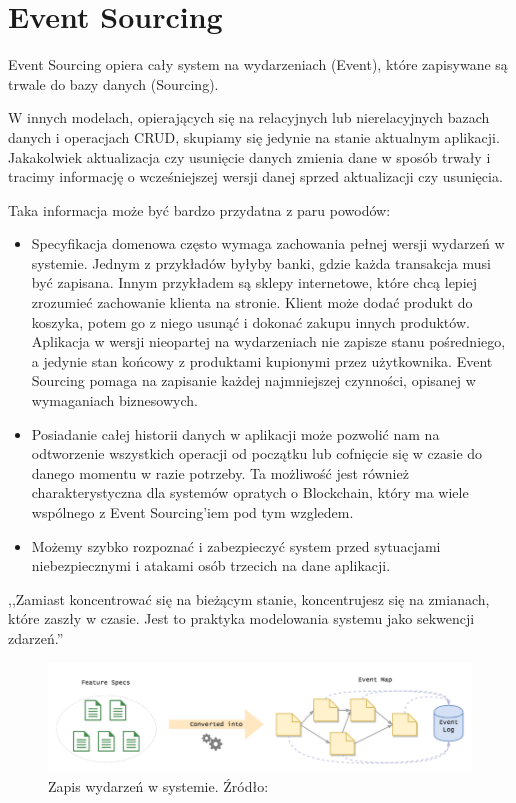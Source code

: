 \section{Event Sourcing}
Event Sourcing opiera cały system na wydarzeniach (Event), które zapisywane są trwale do bazy danych (Sourcing). 

W innych modelach, opierających się na relacyjnych lub nierelacyjnych bazach danych i operacjach CRUD, skupiamy się jedynie na stanie aktualnym aplikacji. Jakakolwiek aktualizacja czy usunięcie danych zmienia dane w sposób trwały i tracimy informację o wcześniejszej wersji danej sprzed aktualizacji czy usunięcia.

Taka informacja może być bardzo przydatna z paru powodów:
\begin{itemize}
    \item Specyfikacja domenowa często wymaga zachowania pełnej wersji wydarzeń w systemie. Jednym z przykładów byłyby banki, gdzie każda transakcja musi być zapisana. Innym przykładem są sklepy internetowe, które chcą lepiej zrozumieć zachowanie klienta na stronie. Klient może dodać produkt do koszyka, potem go z niego usunąć i dokonać zakupu innych produktów. Aplikacja w wersji nieopartej na wydarzeniach nie zapisze stanu pośredniego, a jedynie stan końcowy z produktami kupionymi przez użytkownika. Event Sourcing pomaga na zapisanie każdej najmniejszej czynności, opisanej w wymaganiach biznesowych.
    \item Posiadanie całej historii danych w aplikacji może pozwolić nam na  odtworzenie wszystkich operacji od początku lub cofnięcie się w czasie do danego momentu w razie potrzeby. Ta możliwość jest również charakterystyczna dla systemów opratych o Blockchain, który ma wiele wspólnego z Event Sourcing'iem pod tym wzgledem.
    \item Możemy szybko rozpoznać i zabezpieczyć system przed sytuacjami niebezpiecznymi i atakami osób trzecich na dane aplikacji.
\end{itemize}

,,Zamiast koncentrować się na bieżącym stanie, koncentrujesz się na zmianach, które zaszły w czasie. Jest to praktyka modelowania systemu jako sekwencji zdarzeń.''\cite{EventSourcing1}


\begin{figure}[h!]
  \centering
    \includegraphics[width=1.0\textwidth]{images/eventsourcing.png}
  \caption{Zapis wydarzeń w systemie. Źródło: \cite{EventSourcing1} }
\end{figure}

